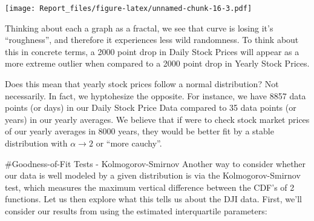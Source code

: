 \documentclass[]{article}
\newenvironment{Shaded}{\begin{snugshade}}{\end{snugshade}}
\newcommand{\CommentTok}[1]{\textcolor[rgb]{0.56,0.35,0.01}{\textit{#1}}}
\newcommand{\ControlFlowTok}[1]{\textcolor[rgb]{0.13,0.29,0.53}{\textbf{#1}}}
\newcommand{\DataTypeTok}[1]{\textcolor[rgb]{0.13,0.29,0.53}{#1}}
\newcommand{\DecValTok}[1]{\textcolor[rgb]{0.00,0.00,0.81}{#1}}
\newcommand{\KeywordTok}[1]{\textcolor[rgb]{0.13,0.29,0.53}{\textbf{#1}}}
\newcommand{\NormalTok}[1]{#1}
\newcommand{\OperatorTok}[1]{\textcolor[rgb]{0.81,0.36,0.00}{\textbf{#1}}}
\newcommand{\OtherTok}[1]{\textcolor[rgb]{0.56,0.35,0.01}{#1}}
\newcommand{\StringTok}[1]{\textcolor[rgb]{0.31,0.60,0.02}{#1}}
\begin{document}
\begin{Shaded}
\end{Shaded}

\texttt{[image: Report\_files/figure-latex/unnamed-chunk-16-3.pdf]}

Thinking about each a graph as a fractal, we see that curve is losing
it's ``roughness'', and therefore it experiences less wild randomness.
To think about this in concrete terms, a 2000 point drop in Daily Stock
Prices will appear as a more extreme outlier when compared to a 2000
point drop in Yearly Stock Prices.

Does this mean that yearly stock prices follow a normal distribution?
Not necessarily. In fact, we hyptohesize the opposite. For instance, we
have 8857 data points (or days) in our Daily Stock Price Data compared
to 35 data points (or years) in our yearly averages. We believe that if
were to check stock market prices of our yearly averages in 8000 years,
they would be better fit by a stable distribution with
\(\alpha \xrightarrow{} 2\) or ``more cauchy''.

\#Goodness-of-Fit Tests - Kolmogorov-Smirnov Another way to consider
whether our data is well modeled by a given distribution is via the
Kolmogorov-Smirnov test, which measures the maximum vertical difference
between the CDF's of 2 functions. Let us then explore what this tells us
about the DJI data. First, we'll consider our results from using the
estimated interquartile parameters:

\begin{Shaded}
\end{Shaded}
\end{document}
